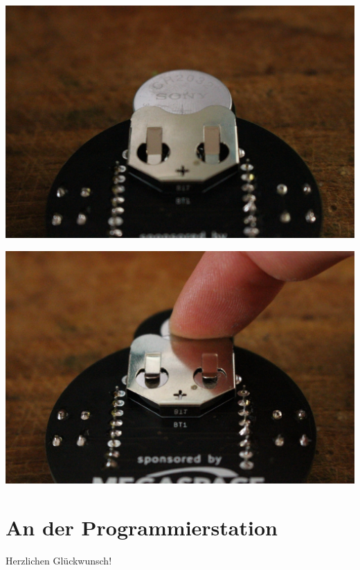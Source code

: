 \documentclass{article}
\begin{document}
\begin{minipage}[b]{0.5\textwidth}
	\includegraphics[width=\textwidth]{Bilder2022/IMG_8248.JPG}
\end{minipage}
\begin{minipage}[b]{0.5\textwidth}
	\includegraphics[width=\textwidth]{Bilder2022/IMG_8249.JPG}
\end{minipage}

\vspace{0.5cm}

\section{An der Programmierstation}

Herzlichen Glückwunsch! \\
\end{document}
